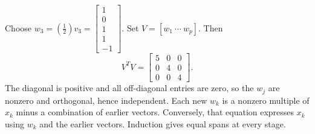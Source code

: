Choose $w_{3}=(\frac{1}{2})v_{3}=\left[\begin{array}{r}1\\0\\1\\1\\-1\end{array}\right]$.
Set $V=[w_1\ \cdots\ w_p]$. Then
\[V^TV=\left[\begin{array}{rrr}5&0&0\\0&4&0\\0&0&4\end{array}\right].\]
The diagonal is positive and all off-diagonal entries are zero, so the $w_j$ are nonzero and orthogonal, hence independent. Each new $w_k$ is a nonzero multiple of $x_k$ minus a combination of earlier vectors. Conversely, that equation expresses $x_k$ using $w_k$ and the earlier vectors. Induction gives equal spans at every stage.

